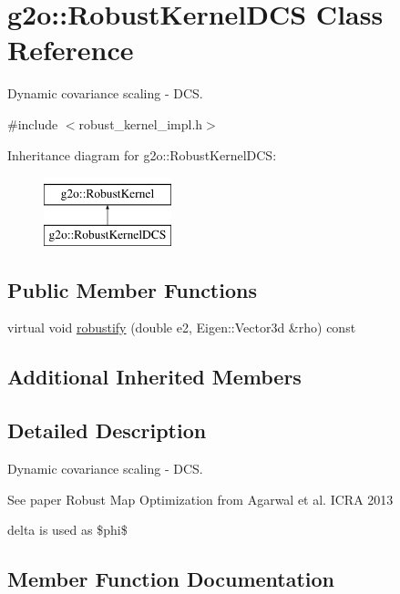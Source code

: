 \hypertarget{classg2o_1_1_robust_kernel_d_c_s}{}\section{g2o\+:\+:Robust\+Kernel\+D\+CS Class Reference}
\label{classg2o_1_1_robust_kernel_d_c_s}


Dynamic covariance scaling -\/ D\+CS.  




{\ttfamily \#include $<$robust\+\_\+kernel\+\_\+impl.\+h$>$}

Inheritance diagram for g2o\+:\+:Robust\+Kernel\+D\+CS\+:\begin{figure}[H]
\begin{center}
\leavevmode
\includegraphics[height=2.000000cm]{classg2o_1_1_robust_kernel_d_c_s}
\end{center}
\end{figure}
\subsection*{Public Member Functions}
\begin{DoxyCompactItemize}
\item 
virtual void \mbox{\hyperlink{classg2o_1_1_robust_kernel_d_c_s_aa469fa37ee76e4483108110b58d5823d}{robustify}} (double e2, Eigen\+::\+Vector3d \&rho) const
\end{DoxyCompactItemize}
\subsection*{Additional Inherited Members}


\subsection{Detailed Description}
Dynamic covariance scaling -\/ D\+CS. 

See paper Robust Map Optimization from Agarwal et al. I\+C\+RA 2013

delta is used as \$phi\$ 

\subsection{Member Function Documentation}
\mbox{\label{classg2o_1_1_robust_kernel_d_c_s_aa469fa37ee76e4483108110b58d5823d}} 
